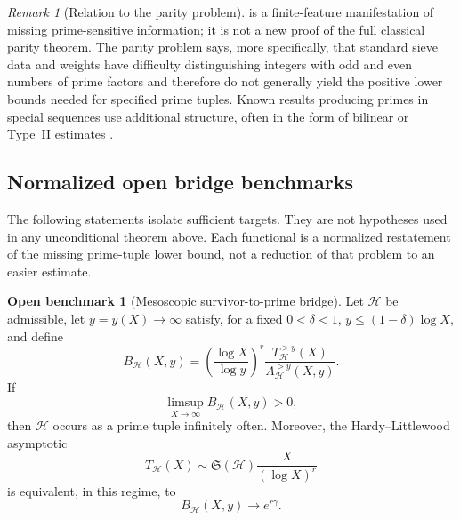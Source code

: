 \documentclass[11pt]{article}
\theoremstyle{definition}
\newtheorem{benchmark}[theorem]{Open benchmark}
\theoremstyle{remark}
\newtheorem{remark}[theorem]{Remark}
\newcommand{\cH}{\mathcal H}
\begin{document}
\begin{remark}[Relation to the parity problem]\label{rem:parity}
 is a finite-feature manifestation of missing prime-sensitive information; it is not a new proof of the full classical parity theorem.  The parity problem says, more specifically, that standard sieve data and weights have difficulty distinguishing integers with odd and even numbers of prime factors and therefore do not generally yield the positive lower bounds needed for specified prime tuples.  Known results producing primes in special sequences use additional structure, often in the form of bilinear or Type~II estimates \citep{FriedlanderIwaniec1998,FordMaynard2024}.
\end{remark}

\subsection{Normalized open bridge benchmarks}

The following statements isolate sufficient targets.  They are not hypotheses used in any unconditional theorem above.  Each functional is a normalized restatement of the missing prime-tuple lower bound, not a reduction of that problem to an easier estimate.

\begin{benchmark}[Mesoscopic survivor-to-prime bridge]\label{crit:mesoscopic}
Let $\cH$ be admissible, let $y=y(X)\to\infty$ satisfy, for a fixed $0<\delta<1$,
$y\le(1-\delta)\log X$, and define
\begin{equation}\label{eq:bridge-functional}
    B_{\cH}(X,y)
    =\left(\frac{\log X}{\log y}\right)^r
      \frac{T_{\cH}^{>y}(X)}{A_{\cH}^{>y}(X,y)}.
\end{equation}
If
\begin{equation}\label{eq:positive-bridge}
    \limsup_{X\to\infty}B_{\cH}(X,y)>0,
\end{equation}
then $\cH$ occurs as a prime tuple infinitely often.  Moreover, the Hardy--Littlewood asymptotic
\begin{equation}\label{eq:hl-asymptotic}
    T_{\cH}(X)\sim\mathfrak S(\cH)\frac{X}{(\log X)^r}
\end{equation}
is equivalent, in this regime, to
\begin{equation}\label{eq:bridge-hl-value}
    B_{\cH}(X,y)\longrightarrow e^{r\gamma}.
\end{equation}
\end{benchmark}
\end{document}
